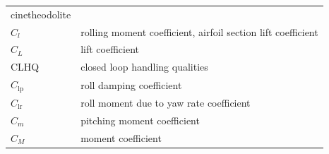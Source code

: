 \documentclass[
]{book}
\begin{document}
\begin{longtable}[]{@{}ll@{}}
\begin{minipage}[t]{0.47\columnwidth}
cinetheodolite\strut
\end{minipage}\tabularnewline
\begin{minipage}[t]{0.47\columnwidth}\raggedright
\(C_l\)\strut
\end{minipage} & \begin{minipage}[t]{0.47\columnwidth}\raggedright
rolling moment coefficient, airfoil section lift coefficient\strut
\end{minipage}\tabularnewline
\begin{minipage}[t]{0.47\columnwidth}\raggedright
\(C_L\)\strut
\end{minipage} & \begin{minipage}[t]{0.47\columnwidth}\raggedright
lift coefficient\strut
\end{minipage}\tabularnewline
\begin{minipage}[t]{0.47\columnwidth}\raggedright
CLHQ\strut
\end{minipage} & \begin{minipage}[t]{0.47\columnwidth}\raggedright
closed loop handling qualities\strut
\end{minipage}\tabularnewline
\begin{minipage}[t]{0.47\columnwidth}\raggedright
\(C_{\mathrm{lp}}\)\strut
\end{minipage} & \begin{minipage}[t]{0.47\columnwidth}\raggedright
roll damping coefficient\strut
\end{minipage}\tabularnewline
\begin{minipage}[t]{0.47\columnwidth}\raggedright
\(C_{\mathrm{lr}}\)\strut
\end{minipage} & \begin{minipage}[t]{0.47\columnwidth}\raggedright
roll moment due to yaw rate coefficient\strut
\end{minipage}\tabularnewline
\begin{minipage}[t]{0.47\columnwidth}\raggedright
\(C_m\)\strut
\end{minipage} & \begin{minipage}[t]{0.47\columnwidth}\raggedright
pitching moment coefficient\strut
\end{minipage}\tabularnewline
\begin{minipage}[t]{0.47\columnwidth}\raggedright
\(C_M\)\strut
\end{minipage} & \begin{minipage}[t]{0.47\columnwidth}\raggedright
moment coefficient\strut
\end{minipage}\tabularnewline

\end{longtable}
\end{document}

